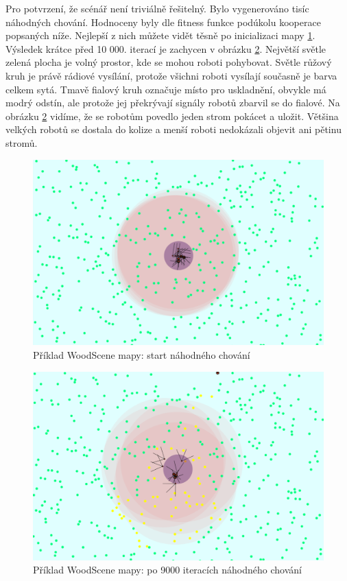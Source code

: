 \par
Pro potvrzení, že scénář není triviálně řešitelný. Bylo vygenerováno tisíc náhodných chování. Hodnoceny byly dle fitness funkce podúkolu kooperace popsaných níže. Nejlepší z nich můžete vidět těsně po inicializaci mapy \ref{obr04:WoodSceneRandomStart}. Výsledek krátce před 10 000. iterací je zachycen v obrázku \ref{obr04:WoodSceneRandomEnd}. Největší světle zelená plocha je volný prostor, kde se mohou roboti pohybovat. Světle růžový kruh je právě rádiové vysílání, protože všichni roboti vysílají současně je barva celkem sytá. Tmavě fialový kruh označuje místo pro uskladnění, obvykle má modrý odstín, ale protože jej překrývají signály robotů zbarvil se do fialové. Na obrázku \ref{obr04:WoodSceneRandomEnd} vidíme, že se robotům povedlo jeden strom pokácet a uložit. Většina velkých robotů se dostala do kolize a menší roboti nedokázali objevit ani pětinu stromů.
\clearpage
\begin{figure}[p]\centering
	\includegraphics[width=\columnwidth]{../img/WoodMap/pictures/StartRandom.png}
	\caption{Příklad WoodScene mapy: start náhodného chování}
	\label{obr04:WoodSceneRandomStart}
\end{figure}
\par
\begin{figure}[p]\centering
	\includegraphics[width=\columnwidth]{../img/WoodMap/pictures/EndRandom.png}
	\caption{Příklad WoodScene mapy: po 9000 iteracích náhodného chování}
	\label{obr04:WoodSceneRandomEnd}
\end{figure}
\clearpage
